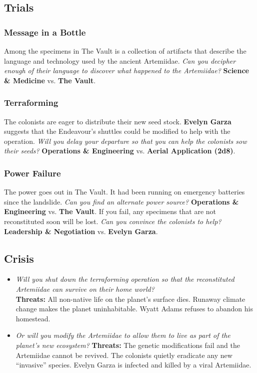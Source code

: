 \documentclass[11pt, a5paper, parskip=half-, DIV=12]{scrartcl}
\begin{document}
\subsection*{Trials}

\subsubsection*{Message in a Bottle}
Among the specimens in The Vault is a collection of artifacts that describe the language and technology used by the ancient Artemiidae. \textit{Can you decipher enough of their language to discover what happened to the Artemiidae?} \textbf{Science \& Medicine} vs. \textbf{The Vault}.

\subsubsection*{Terraforming}
The colonists are eager to distribute their new seed stock. \textbf{Evelyn Garza} suggests that the Endeavour's shuttles could be modified to help with the operation. \textit{Will you delay your departure so that you can help the colonists sow their seeds?}
\textbf{Operations \& Engineering} vs. \textbf{Aerial Application (2d8)}.

\subsubsection*{Power Failure}
The power goes out in The Vault. It had been running on emergency batteries since the landslide. \textit{Can you find an alternate power source?} \textbf{Operations \& Engineering} vs. \textbf{The Vault}. If you fail, any specimens that are not reconstituted soon will be lost. \textit{Can you convince the colonists to help?} \textbf{Leadership \& Negotiation} vs. \textbf{Evelyn Garza}.



\subsection*{Crisis}
\begin{itemize}
	\item \textit{Will you shut down the terraforming operation so that the reconstituted Artemiidae can survive on their home world?} \\ \textbf{Threats:} All non-native life on the planet's surface dies. Runaway climate change makes the planet uninhabitable. Wyatt Adams refuses to abandon his homestead.
	\item \textit{Or will you modify the Artemiidae to allow them to live as part of the planet's new ecosystem?} \textbf{Threats:} The genetic modifications fail and the Artemiidae cannot be revived. The colonists quietly eradicate any new ``invasive'' species. Evelyn Garza is infected and killed by a viral Artemiidae.
\end{itemize}
\end{document}
